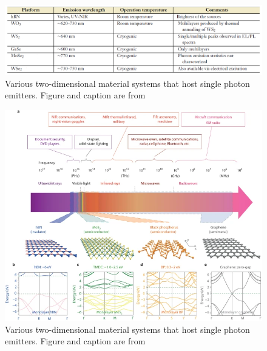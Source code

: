 \documentclass[]{article}
\begin{document}
\begin{figure}[htb]
	\centering
	\includegraphics[width = \linewidth]{TMDC_table.PNG}
	\caption{Various two-dimensional material systems that host single photon emitters. Figure and caption are from \cite{SP_sources_atomically_thin_materials_review}}
	\label{fig: TMDC_table}
\end{figure}

\begin{figure}[htb]
	\centering
	\includegraphics[width = \linewidth]{TMDC_hBN_band_emission_properties.PNG}
	\caption{Various two-dimensional material systems that host single photon emitters. Figure and caption are from \cite{2D_material_nanophotonics_HBN_BANDGAP}}
	\label{fig: TMDC_hBN_band_emission_properties}
\end{figure}
\end{document}

